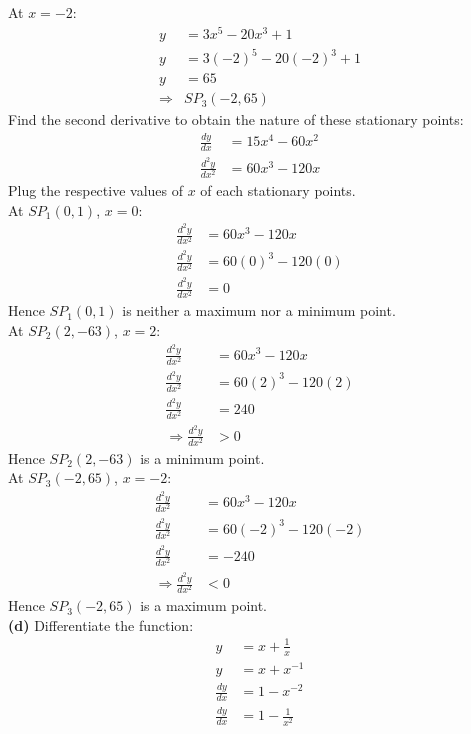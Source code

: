 \documentclass[hidelinks, a4paper, 12pt]{article}
\newcommand{\bd}{\textbf}
\newcommand{\n}{\\[\baselineskip]}
\newcommand{\thus}{\Rightarrow}
\newcommand{\dydx}{\frac{dy}{dx}}
\newcommand{\dydxx}{\frac{d^2y}{dx^2}}
\begin{document}
                At $x = -2$:
                \[\begin{split}
                    y &= 3x^5 - 20x^3 +1\\
                    y &= 3(-2)^5 - 20(-2)^3 +1\\
                    y &= 65\\
                    \thus &SP_3(-2,65)
                \end{split}\]
                Find the second derivative to obtain the nature of these stationary points:
                \[\begin{split}
                    \dydx &= 15x^4 - 60x^2\\
                    \dydxx &= 60x^3 - 120x
                \end{split}\]
                Plug the respective values of $x$ of each stationary points.\n
                At $SP_1(0,1)$, $x=0$:
                \[\begin{split}
                    \dydxx &= 60x^3 - 120x\\
                    \dydxx &= 60(0)^3 - 120(0)\\
                    \dydxx &= 0
                \end{split}\]
                Hence $SP_1(0,1)$ is neither a maximum nor a minimum point.\n
                At $SP_2(2,-63)$, $x=2$:
                \[\begin{split}
                    \dydxx &= 60x^3 - 120x\\
                    \dydxx &= 60(2)^3 - 120(2)\\
                    \dydxx &= 240\\
                    \thus \dydxx &> 0
                \end{split}\]
                Hence $SP_2(2,-63)$ is a minimum point.\n
                At $SP_3(-2,65)$, $x=-2$:
                \[\begin{split}
                    \dydxx &= 60x^3 - 120x\\
                    \dydxx &= 60(-2)^3 -120(-2)\\
                    \dydxx &= -240\\
                    \thus \dydxx &< 0
                \end{split}\]
                Hence $SP_3(-2,65)$ is a maximum point.\n
                \bd{(d)} Differentiate the function:
                \[\begin{split}
                    y &= x + \frac{1}{x}\\
                    y &= x + x^{-1}\\
                    \dydx &= 1 -x^{-2}\\
                    \dydx &= 1 -\frac{1}{x^2}
                \end{split}\]
\end{document}
